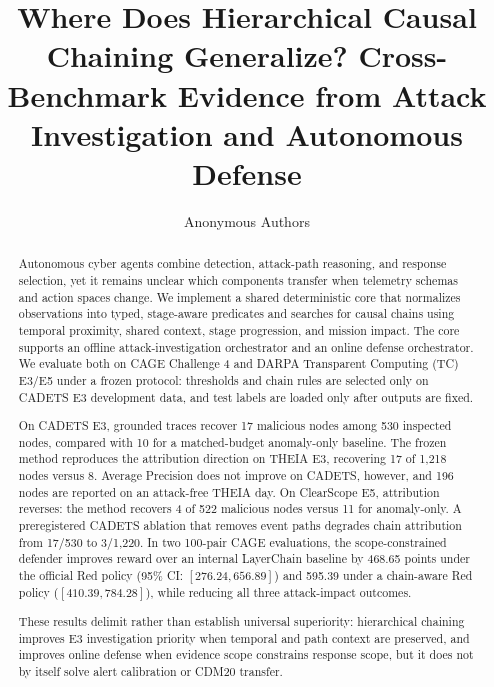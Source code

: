 \documentclass[runningheads]{llncs}
\begin{document}
\title{Where Does Hierarchical Causal Chaining Generalize? Cross-Benchmark Evidence from Attack Investigation and Autonomous Defense}

\author{Anonymous Authors}

\maketitle

\begin{abstract}
Autonomous cyber agents combine detection, attack-path reasoning, and response selection, yet it remains unclear which components transfer when telemetry schemas and action spaces change. We implement a shared deterministic core that normalizes observations into typed, stage-aware predicates and searches for causal chains using temporal proximity, shared context, stage progression, and mission impact. The core supports an offline attack-investigation orchestrator and an online defense orchestrator. We evaluate both on CAGE Challenge 4 and DARPA Transparent Computing (TC) E3/E5 under a frozen protocol: thresholds and chain rules are selected only on CADETS E3 development data, and test labels are loaded only after outputs are fixed.

On CADETS E3, grounded traces recover 17 malicious nodes among 530 inspected nodes, compared with 10 for a matched-budget anomaly-only baseline. The frozen method reproduces the attribution direction on THEIA E3, recovering 17 of 1,218 nodes versus 8. Average Precision does not improve on CADETS, however, and 196 nodes are reported on an attack-free THEIA day. On ClearScope E5, attribution reverses: the method recovers 4 of 522 malicious nodes versus 11 for anomaly-only. A preregistered CADETS ablation that removes event paths degrades chain attribution from 17/530 to 3/1,220. In two 100-pair CAGE evaluations, the scope-constrained defender improves reward over an internal LayerChain baseline by 468.65 points under the official Red policy (95\% CI: $[276.24,656.89]$) and 595.39 under a chain-aware Red policy ($[410.39,784.28]$), while reducing all three attack-impact outcomes.

These results delimit rather than establish universal superiority: hierarchical chaining improves E3 investigation priority when temporal and path context are preserved, and improves online defense when evidence scope constrains response scope, but it does not by itself solve alert calibration or CDM20 transfer.

\end{abstract}
\end{document}
